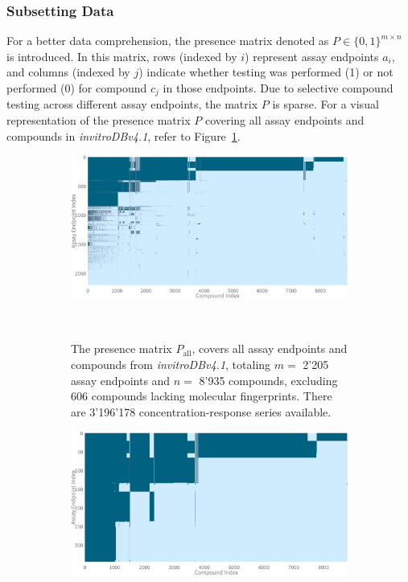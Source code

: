 \subsubsection{Subsetting Data}
For a better data comprehension, the presence matrix denoted as $P \in {\{0, 1\}}^{m \times n}$ is introduced. In this matrix, rows (indexed by $i$) represent assay endpoints $a_i$, and columns (indexed by $j$) indicate whether testing was performed (1) or not performed (0) for compound $c_j$ in those endpoints. Due to selective compound testing across different assay endpoints, the matrix $P$ is sparse. For a visual representation of the presence matrix $P$ covering all assay endpoints and compounds in \textit{invitroDBv4.1}, refer to Figure~\ref{fig:presence_matrix_all}.

\begin{figure}
    \centering
    \begin{subfigure}[b]{0.48\textwidth}
        \centering
        \includegraphics[width=\textwidth]{figures/presence_matrix_all.png}
        \caption{The presence matrix $P_{\text{all}}$, covers all assay endpoints and compounds from \emph{invitroDBv4.1}, totaling $m =$ 2'205 assay endpoints and $n =$ 8'935 compounds, excluding 606 compounds lacking molecular fingerprints. There are 3'196'178 concentration-response series available.}
    ~\label{fig:presence_matrix_all}
    \end{subfigure}
    \hfill
    \begin{subfigure}[b]{0.48\textwidth}
        \centering
        \includegraphics[width=\textwidth]{figures/presence_matrix_subset.png}

\end{subfigure}
\end{figure}
